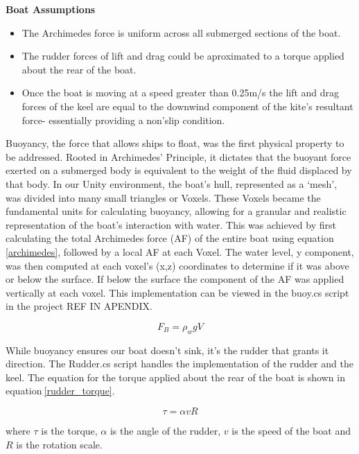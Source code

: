 \textbf{Boat Assumptions}
\begin{itemize}
    \item The Archimedes force is uniform across all submerged sections of the boat.
    \item The rudder forces of lift and drag could be aproximated to a torque applied about the rear of the boat.
    \item Once the boat is moving at a speed greater than 0.25m/s the lift and drag forces of the keel are equal to the downwind component of the kite's resultant force- essentially providing a non'slip condition.
\end{itemize}
Buoyancy, the force that allows ships to float, was the first physical property to be addressed. Rooted in Archimedes' Principle, it dictates that the buoyant force exerted on a submerged body is equivalent to the weight of the fluid displaced by that body. In our Unity environment, the boat's hull, represented as a `mesh', was divided into many small triangles or Voxels. These Voxels became the fundamental units for calculating buoyancy, allowing for a granular and realistic representation of the boat's interaction with water. This was achieved by first calculating the total Archimedes force (AF) of the entire boat using equation$~$\ref{archimedes}, followed by a local AF at each Voxel. The water level, y component, was then computed at each voxel's (x,z) coordinates to determine if it was above or below the surface. If below the surface the component of the AF was applied vertically at each voxel. This implementation can be viewed in the buoy.cs script in the project REF IN APENDIX.

\begin{equation}
    F_B = \rho_{w}gV
    \label{archimedes}
\end{equation}

While buoyancy ensures our boat doesn't sink, it's the rudder that grants it direction. The Rudder.cs script handles the implementation of the rudder and the keel. The equation for the torque applied about the rear of the boat is shown in equation$~$\ref{rudder_torque}. 

\begin{equation}
    \tau = \alpha v R
    \label{rudder_torque}
\end{equation}

where $\tau$ is the torque, $\alpha$ is the angle of the rudder, $v$ is the speed of the boat and $R$ is the rotation scale.

